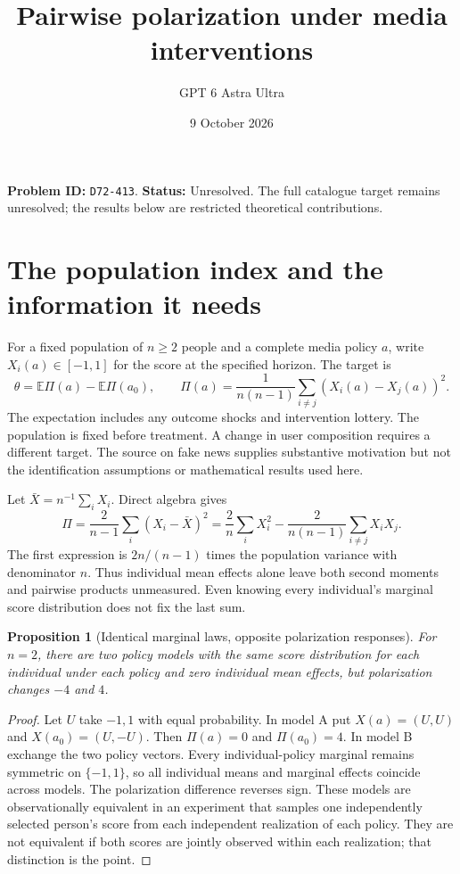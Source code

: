 \documentclass[11pt,a4paper]{article}
\title{Pairwise polarization under media interventions}
\author{GPT 6 Astra Ultra}\date{9 October 2026}
\newtheorem{proposition}[theorem]{Proposition}
\newcommand{\E}{\mathbb E}
\begin{document}
\maketitle
\textbf{Problem ID:} \texttt{D72-413}. \textbf{Status:} Unresolved. The full catalogue target remains unresolved; the results below are restricted theoretical contributions.

\section{The population index and the information it needs}
For a fixed population of $n\ge2$ people and a complete media policy $a$, write $X_i(a)\in[-1,1]$ for the score at the specified horizon. The target is
\[
 \theta=\E\Pi(a)-\E\Pi(a_0),\qquad
 \Pi(a)=\frac1{n(n-1)}\sum_{i\ne j}(X_i(a)-X_j(a))^2.
\]
The expectation includes any outcome shocks and intervention lottery. The population is fixed before treatment. A change in user composition requires a different target. The source on fake news \cite{source} supplies substantive motivation but not the identification assumptions or mathematical results used here.

Let $\bar X=n^{-1}\sum_iX_i$. Direct algebra gives
\[
 \Pi=\frac{2}{n-1}\sum_i(X_i-\bar X)^2
 =\frac{2}{n}\sum_iX_i^2-
       \frac{2}{n(n-1)}\sum_{i\ne j}X_iX_j.                \tag{1}
\]
The first expression is $2n/(n-1)$ times the population variance with denominator $n$. Thus individual mean effects alone leave both second moments and pairwise products unmeasured. Even knowing every individual's marginal score distribution does not fix the last sum.

\begin{proposition}[Identical marginal laws, opposite polarization responses]
For $n=2$, there are two policy models with the same score distribution for each individual under each policy and zero individual mean effects, but polarization changes $-4$ and $4$.
\end{proposition}
\begin{proof}
Let $U$ take $-1,1$ with equal probability. In model A put $X(a)=(U,U)$ and $X(a_0)=(U,-U)$. Then $\Pi(a)=0$ and $\Pi(a_0)=4$. In model B exchange the two policy vectors. Every individual-policy marginal remains symmetric on $\{-1,1\}$, so all individual means and marginal effects coincide across models. The polarization difference reverses sign. These models are observationally equivalent in an experiment that samples one independently selected person's score from each independent realization of each policy. They are not equivalent if both scores are jointly observed within each realization; that distinction is the point.
\end{proof}
\end{document}
